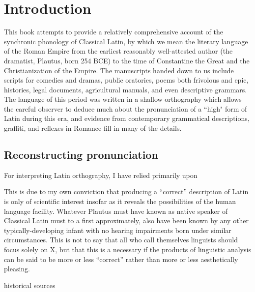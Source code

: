 \chapter{Introduction}

This book attempts to provide a relatively comprehensive account of the synchronic phonology of Classical Latin, by which we mean the literary language of the Roman Empire from the earliest reasonably well-attested author (the dramatist, Plautus, born 254 BCE) to the time of Constantine the Great and the Christianization of the Empire.
The manuscripts handed down to us include scripts for comedies and dramas, public oratories, poems both frivolous and epic, histories, legal documents, agricultural manuals, and even descriptive grammars.
The language of this period was written in a shallow orthography which allows the careful observer to deduce much about the pronunciation of a ``high" form of Latin during this era, and evidence from contemporary grammatical descriptions, graffiti, and reflexes in Romance fill in many of the details.

\section{Reconstructing pronunciation}

For interpreting Latin orthography, I have relied primarily upon \citet{Allen1978}

This is due to my own conviction that producing a ``correct'' description of Latin is only of scientific interest insofar as it reveals the possibilities of the human language facility.
Whatever Plautus must have known as native speaker of Classical Latin must to a first approximately, also have been known by any other typically-developing infant with no hearing impairments born under similar circumstances.
This is not to say that all who call themselves linguists should focus solely on X, but that this is a necessary if the products of linguistic analysis can be said to be more or less ``correct'' rather than more or less aesthetically pleasing.


historical sources

